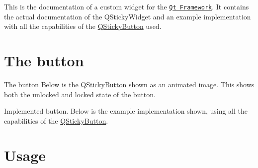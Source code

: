 This is the documentation of a custom widget for the \href{http://www.qt.io/}{\tt Qt Framework}. It contains the actual documentation of the Q\-Sticky\-Widget and an example implementation with all the capabilities of the \hyperlink{class_q_sticky_button}{Q\-Sticky\-Button} used.\hypertarget{index_button_example_section}{}\section{The button}\label{index_button_example_section}
\begin{DoxyParagraph}{The button}
Below is the \hyperlink{class_q_sticky_button}{Q\-Sticky\-Button} shown as an animated image. This shows both the unlocked and locked state of the button. 
\end{DoxyParagraph}
\begin{DoxyParagraph}{Implemented button.}
Below is the example implementation shown, using all the capabilities of the \hyperlink{class_q_sticky_button}{Q\-Sticky\-Button}. 
\end{DoxyParagraph}
\hypertarget{index_usage_section}{}\section{Usage}\label{index_usage_section}


